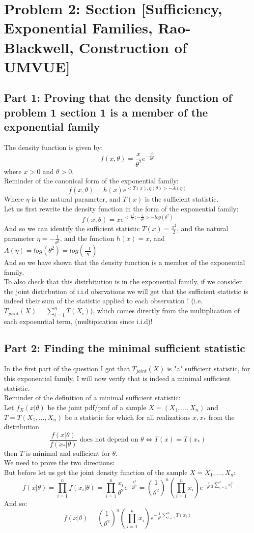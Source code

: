 \documentclass[12pt]{article}
\begin{document}
\section*{Problem 2: Section [Sufficiency, Exponential Families, Rao-Blackwell, Construction of UMVUE]}
\subsection*{Part 1: Proving that the density function of problem 1 section 1 is a member of the exponential family}
The density function is given by:
\[
f(x,\theta) = \frac{x}{\theta^2}e^{-\frac{x^2}{2\theta^2}}
\]
where $x>0$ and $\theta>0$.\\
Reminder of the canonical form of the exponential family:
\[
f(x,\theta) = h(x)e^{<T(x),\eta(\theta)>-A(\eta)}
\]
Where $\eta$ is the natural parameter, and $T(x)$ is the sufficient statistic.\\
Let us first rewrite the density function in the form of the exponential family:
\[
f(x,\theta) = x e^{<\frac{x^2}{2};-\frac{1}{\theta^2}>-log(\theta^2)}
\]
And so we can identify the sufficient statistic $T(x) = \frac{x^2}{2}$, and the natural parameter $\eta = -\frac{1}{\theta^2}$, and the function $h(x) = x$, and $A(\eta) = log(\theta^2) = log(\frac{-1}{\eta})$\\
And so we have shown that the density function is a member of the exponential family.\\ 
To also check that this distrbitution is in the exponential family, if we consider the joint distirbution of i.i.d obsrvations we will get that the sufficient statistic is indeed their sum of the statistic applied to each observation ! (i.e. $T_{joint}(X) = \sum_{i=1}^{n}T(X_i)$), which comes directly from the multiplication of each expoenntial term, (multipication since i.i.d)!
\subsection*{Part 2: Finding the minimal sufficient statistic}
In the first part of the question I got that $T_{joint}(X)$ is "a" sufficient statistic, for this exponential family. I will now verify that is indeed a minimal sufficient statistic.\\
Reminder of the definition of a minimal sufficient statistic:\\
Let $f_X(x|\theta)$ be the joint pdf/pmf of a sample $X = (X_1, \dots, X_n)$ and $T = T(X_1, \dots, X_n)$ be a statistic for which for all realizations $x, x_*$ from the distribution
\[
\frac{f(x|\theta)}{f(x_*|\theta)} \text{ does not depend on } \theta \iff T(x) = T(x_*)
\]
then $T$ is minimal and sufficient for $\theta$.\\ 
We need to prove the two directions: \\
But before let us get the joint density function of the sample $X = X_1, ..., X_n$:
\[
f(x|\theta) = \prod_{i=1}^{n}f(x_i|\theta) = \prod_{i=1}^{n}\frac{x_i}{\theta^2}e^{-\frac{x_i^2}{2\theta^2}} = (\frac{1}{\theta^2})^n (\prod_{i=1}^{n}x_i)e^{-\frac{1}{\theta^2}\frac{1}{2}\sum_{i=1}^{n}x_i^2}
\]
And so: 
\[
f(x|\theta) = (\frac{1}{\theta^2})^n (\prod_{i=1}^{n}x_i)e^{-\frac{1}{\theta^2}\sum_{i=1}^{n}T(x_i)}
\]
\end{document}
